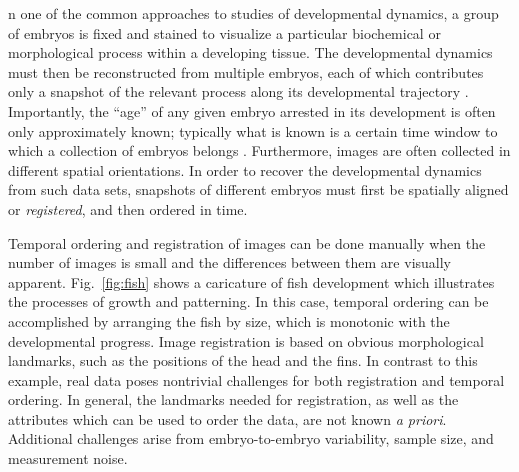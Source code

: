 \documentclass{pnastwo}
\newcommand{\fig}[0]{Fig.}
\begin{document}
\begin{article}




n one of the common approaches to studies of developmental dynamics, a group of embryos is fixed and stained to visualize a particular biochemical or morphological process within a developing tissue. 
%
The developmental dynamics must then be reconstructed from multiple embryos, each of which contributes only a snapshot of the relevant process along its developmental trajectory \cite{jaeger2004dynamic, peter2011gene, fowlkes2008quantitative}.
%
Importantly, the ``age'' of any given embryo arrested in its development is often only approximately known; typically what is known is
a certain time window to which a collection of embryos belongs \cite{ng2012large, richardson2014emage, castro2009automatic}.
%
Furthermore, images are often collected in different spatial orientations.
%
In order to recover the developmental dynamics from such data sets, snapshots of different embryos must first be spatially aligned or {\em registered}, and then ordered in time.
%


Temporal ordering and registration of images can be done manually
when the number of images is small and the differences between them are visually apparent. 
%
\fig~\ref{fig:fish} shows a caricature of fish development which illustrates the processes of growth and patterning.
%
In this case, temporal ordering can be accomplished by arranging the fish by size, which is monotonic with the developmental progress.
%
Image registration is based on obvious morphological landmarks, such as the positions of the head and the fins.
%
In contrast to this example, real data poses nontrivial challenges for both registration and temporal ordering.
%
In general, the landmarks needed for registration, as well as the attributes which can be used to order the data, are not known {\it a priori}.
%
Additional challenges arise from embryo-to-embryo variability, sample size, and measurement noise.



\end{article}
\end{document}
